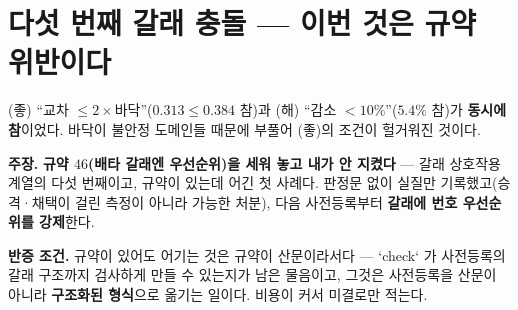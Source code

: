 \documentclass[10pt,a4paper]{article}
\newcommand{\claim}[2]{\begin{claimbox}\textbf{주장.} #1\par\smallskip
  \textcolor{gray!70}{\textbf{반증 조건.} #2}\end{claimbox}}
\begin{document}
\section{다섯 번째 갈래 충돌 --- 이번 것은 규약 위반이다}

(좋) ``교차 $\leq 2\times$바닥''($0.313 \leq 0.384$ 참)과 (해) ``감소
$<10\%$''($5.4\%$ 참)가 \textbf{동시에 참}이었다. 바닥이 불안정 도메인들
때문에 부풀어 (좋)의 조건이 헐거워진 것이다.

\claim{\textbf{규약 $46$(배타 갈래엔 우선순위)을 세워 놓고 내가 안 지켰다} ---
갈래 상호작용 계열의 다섯 번째이고, 규약이 있는데 어긴 첫 사례다. 판정문 없이
실질만 기록했고(승격·채택이 걸린 측정이 아니라 가능한 처분), 다음 사전등록부터
\textbf{갈래에 번호 우선순위를 강제}한다.}
{규약이 있어도 어기는 것은 규약이 산문이라서다 --- `check` 가 사전등록의 갈래
구조까지 검사하게 만들 수 있는지가 남은 물음이고, 그것은 사전등록을 산문이
아니라 \textbf{구조화된 형식}으로 옮기는 일이다. 비용이 커서 미결로만 적는다.}
\end{document}
